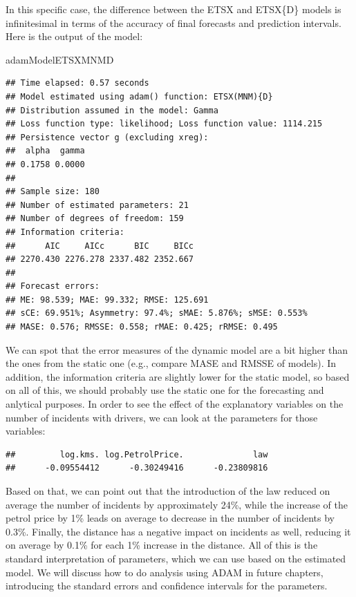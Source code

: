 \documentclass[
]{book}
\newenvironment{Shaded}{\begin{snugshade}}{\end{snugshade}}
\newcommand{\NormalTok}[1]{#1}
\newcommand{\SpecialCharTok}[1]{\textcolor[rgb]{0.00,0.00,0.00}{#1}}
\theoremstyle{definition}
\theoremstyle{definition}
\theoremstyle{definition}
\theoremstyle{definition}
\theoremstyle{remark}
\begin{document}
In this specific case, the difference between the ETSX and ETSX\{D\} models is infinitesimal in terms of the accuracy of final forecasts and prediction intervals. Here is the output of the model:

\begin{Shaded}
\begin{Highlighting}[]
\NormalTok{adamModelETSXMNMD}
\end{Highlighting}
\end{Shaded}

\begin{verbatim}
## Time elapsed: 0.57 seconds
## Model estimated using adam() function: ETSX(MNM){D}
## Distribution assumed in the model: Gamma
## Loss function type: likelihood; Loss function value: 1114.215
## Persistence vector g (excluding xreg):
##  alpha  gamma 
## 0.1758 0.0000 
## 
## Sample size: 180
## Number of estimated parameters: 21
## Number of degrees of freedom: 159
## Information criteria:
##      AIC     AICc      BIC     BICc 
## 2270.430 2276.278 2337.482 2352.667 
## 
## Forecast errors:
## ME: 98.539; MAE: 99.332; RMSE: 125.691
## sCE: 69.951%; Asymmetry: 97.4%; sMAE: 5.876%; sMSE: 0.553%
## MASE: 0.576; RMSSE: 0.558; rMAE: 0.425; rRMSE: 0.495
\end{verbatim}

We can spot that the error measures of the dynamic model are a bit higher than the ones from the static one (e.g., compare MASE and RMSSE of models). In addition, the information criteria are slightly lower for the static model, so based on all of this, we should probably use the static one for the forecasting and anlytical purposes. In order to see the effect of the explanatory variables on the number of incidents with drivers, we can look at the parameters for those variables:

\begin{Shaded}
\end{Shaded}

\begin{verbatim}
##         log.kms. log.PetrolPrice.              law 
##      -0.09554412      -0.30249416      -0.23809816
\end{verbatim}

Based on that, we can point out that the introduction of the law reduced on average the number of incidents by approximately 24\%, while the increase of the petrol price by 1\% leads on average to decrease in the number of incidents by 0.3\%. Finally, the distance has a negative impact on incidents as well, reducing it on average by 0.1\% for each 1\% increase in the distance. All of this is the standard interpretation of parameters, which we can use based on the estimated model. We will discuss how to do analysis using ADAM in future chapters, introducing the standard errors and confidence intervals for the parameters.
\end{document}
